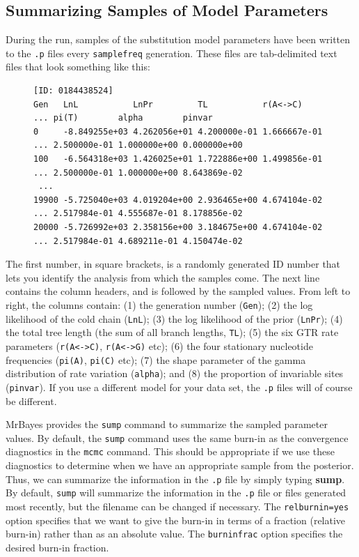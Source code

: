 \documentclass[12pt]{book}
\begin{document}
\subsection{Summarizing Samples of Model Parameters}

During the run, samples of the substitution model parameters have been written to the \texttt{.p}
files every \texttt{samplefreq} generation. These files are tab-delimited text files that look
something like this:

\begin{figure}[h]
\centering
\begin{BVerbatim}[fontsize=\scriptsize]
[ID: 0184438524]
Gen   LnL           LnPr         TL           r(A<->C)     ... pi(T)        alpha        pinvar
0     -8.849255e+03 4.262056e+01 4.200000e-01 1.666667e-01 ... 2.500000e-01 1.000000e+00 0.000000e+00
100   -6.564318e+03 1.426025e+01 1.722886e+00 1.499856e-01 ... 2.500000e-01 1.000000e+00 8.643869e-02
 ...
19900 -5.725040e+03 4.019204e+00 2.936465e+00 4.674104e-02 ... 2.517984e-01 4.555687e-01 8.178856e-02
20000 -5.726992e+03 2.358156e+00 3.184675e+00 4.674104e-02 ... 2.517984e-01 4.689211e-01 4.150474e-02
\end{BVerbatim}
\end{figure}

The first number, in square brackets, is a randomly generated ID number that lets you identify the
analysis from which the samples come. The next line contains the column headers, and is followed by
the sampled values. From left to right, the columns contain: (1) the generation number (\texttt{Gen});
(2) the log likelihood of the cold chain (\texttt{LnL}); (3) the log likelihood of the prior
(\texttt{LnPr});
(4) the total tree length (the sum of all branch lengths, \texttt{TL}); (5) the six GTR rate
parameters (\texttt{r(A<->C)}, \texttt{r(A<->G)} etc); (6) the four stationary nucleotide
frequencies (\texttt{pi(A)}, \texttt{pi(C)} etc); (7) the shape parameter of the gamma distribution
of rate variation (\texttt{alpha}); and (8) the proportion of invariable sites (\texttt{pinvar}).
If you use a different model for your data set, the \texttt{.p} files will of course be different.

MrBayes provides the \texttt{sump} command to summarize the sampled parameter values. By default,
the \texttt{sump} command uses the same burn-in as the convergence diagnostics in the \texttt{mcmc}
command.  This should be appropriate if we use these diagnostics to determine when we have an
appropriate sample from the posterior. Thus, we can summarize the information in the \texttt{.p}
file by simply typing \textbf{sump}. By default, \texttt{sump} will summarize the information in
the \texttt{.p} file or files generated most recently, but the filename can be changed if
necessary. The \texttt{relburnin=yes} option specifies that we want to give the burn-in in terms of
a fraction (relative burn-in) rather than as an absolute value. The \texttt{burninfrac} option
specifies the desired burn-in fraction.
\end{document}
